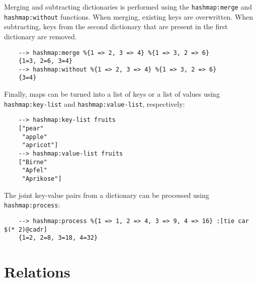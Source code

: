 Merging and subtracting dictionaries is performed using the \verb|hashmap:merge| and \verb|hashmap:without| functions. When merging, existing keys are overwritten. When subtracting, keys from the second dictionary that are present in the first dictionary are removed.

\begin{Verbatim}
    --> hashmap:merge %{1 => 2, 3 => 4} %{1 => 3, 2 => 6}
    {1=3, 2=6, 3=4}
    --> hashmap:without %{1 => 2, 3 => 4} %{1 => 3, 2 => 6}
    {3=4}
\end{Verbatim}

Finally, maps can be turned into a list of keys or a list of values using \verb|hashmap:key-list| and \verb|hashmap:value-list|, respectively:

\begin{Verbatim}
    --> hashmap:key-list fruits
    ["pear"
     "apple"
     "apricot"]
    --> hashmap:value-list fruits
    ["Birne"
     "Apfel"
     "Aprikose"]
\end{Verbatim}

The joint key-value pairs from a dictionary can be processed using \verb|hashmap:process|:

\begin{Verbatim}
    --> hashmap:process %{1 => 1, 2 => 4, 3 => 9, 4 => 16} :[tie car $(* 2)@cadr]
    {1=2, 2=8, 3=18, 4=32}
\end{Verbatim}

\section{Relations}

